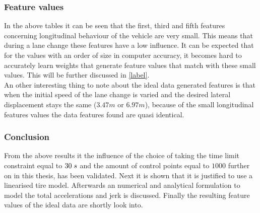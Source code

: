 \subsubsection{Feature values}
In the above tables it can be seen that the first, third and fifth features concerning longitudinal behaviour of the vehicle are very small. This means that during a lane change these features have a low influence. It can be expected that for the values with an order of size in computer accuracy, it becomes hard to accurately learn weights that generate feature values that match with these small values. This will be further discussed in \ref{label}.\\%

An other interesting thing to note about the ideal data generated features is that when the initial speed of the lane change is varied and the desired lateral displacement stays the same ($3.47m$ or $6.97m$), because of the small longitudinal features values the data features found are quasi identical.

\subsubsection{Conclusion}
From the above results it the influence of the choice of taking the time limit constraint equal to $30 \hspace{1mm}s$ and the amount of control points equal to $1000$ further on in this thesis, has been validated. Next it is shown that it is justified to use a linearised tire model. Afterwards an numerical and analytical formulation to model the total accelerations and jerk is discussed. Finally the resulting feature values of the ideal data are shortly look into. 


